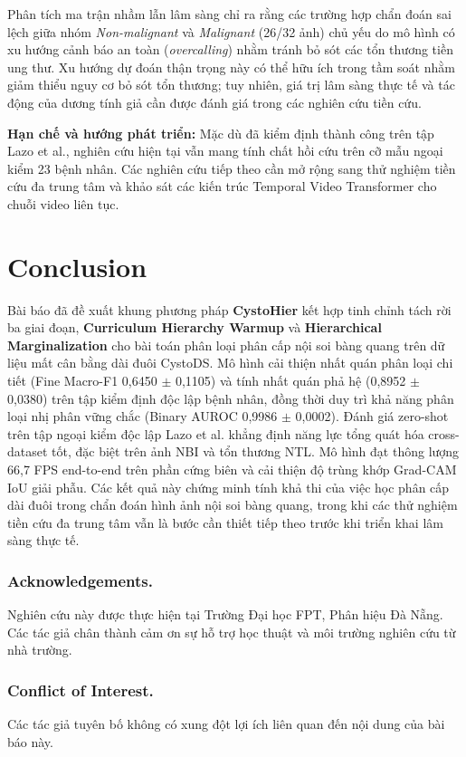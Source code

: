 \documentclass[runningheads]{llncs}
\begin{document}
Phân tích ma trận nhầm lẫn lâm sàng chỉ ra rằng các trường hợp chẩn đoán sai lệch giữa nhóm \textit{Non-malignant} và \textit{Malignant} (26/32 ảnh) chủ yếu do mô hình có xu hướng cảnh báo an toàn (\textit{overcalling}) nhằm tránh bỏ sót các tổn thương tiền ung thư. Xu hướng dự đoán thận trọng này có thể hữu ích trong tầm soát nhằm giảm thiểu nguy cơ bỏ sót tổn thương; tuy nhiên, giá trị lâm sàng thực tế và tác động của dương tính giả cần được đánh giá trong các nghiên cứu tiền cứu.

\noindent \textbf{Hạn chế và hướng phát triển:} Mặc dù đã kiểm định thành công trên tập Lazo et al., nghiên cứu hiện tại vẫn mang tính chất hồi cứu trên cỡ mẫu ngoại kiểm 23 bệnh nhân. Các nghiên cứu tiếp theo cần mở rộng sang thử nghiệm tiền cứu đa trung tâm và khảo sát các kiến trúc Temporal Video Transformer cho chuỗi video liên tục.

\section{Conclusion}
\label{sec:conclusion}
Bài báo đã đề xuất khung phương pháp \textbf{CystoHier} kết hợp tinh chỉnh tách rời ba giai đoạn, \textbf{Curriculum Hierarchy Warmup} và \textbf{Hierarchical Marginalization} cho bài toán phân loại phân cấp nội soi bàng quang trên dữ liệu mất cân bằng dài đuôi CystoDS. Mô hình cải thiện nhất quán phân loại chi tiết (Fine Macro-F1 0,6450 $\pm$ 0,1105) và tính nhất quán phả hệ (0,8952 $\pm$ 0,0380) trên tập kiểm định độc lập bệnh nhân, đồng thời duy trì khả năng phân loại nhị phân vững chắc (Binary AUROC 0,9986 $\pm$ 0,0002). Đánh giá zero-shot trên tập ngoại kiểm độc lập Lazo et al. khẳng định năng lực tổng quát hóa cross-dataset tốt, đặc biệt trên ảnh NBI và tổn thương NTL. Mô hình đạt thông lượng 66,7 FPS end-to-end trên phần cứng biên và cải thiện độ trùng khớp Grad-CAM IoU giải phẫu. Các kết quả này chứng minh tính khả thi của việc học phân cấp dài đuôi trong chẩn đoán hình ảnh nội soi bàng quang, trong khi các thử nghiệm tiền cứu đa trung tâm vẫn là bước cần thiết tiếp theo trước khi triển khai lâm sàng thực tế.

\subsubsection*{Acknowledgements.}
Nghiên cứu này được thực hiện tại Trường Đại học FPT, Phân hiệu Đà Nẵng. Các tác giả chân thành cảm ơn sự hỗ trợ học thuật và môi trường nghiên cứu từ nhà trường.

\subsubsection*{Conflict of Interest.}
Các tác giả tuyên bố không có xung đột lợi ích liên quan đến nội dung của bài báo này.
\end{document}
